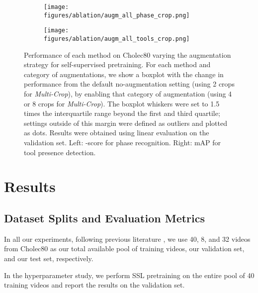\documentclass[times,twocolumn,final]{elsarticle}
\begin{document}
\begin{figure*}[ht]
  \centering
  \begin{subfigure}
    \centering
    \texttt{[image: figures/ablation/augm\_all\_phase\_crop.png]}
  \end{subfigure}
  \begin{subfigure}
    \centering
    \texttt{[image: figures/ablation/augm\_all\_tools\_crop.png]} 
  \end{subfigure}
  \caption{Performance of each method on Cholec80 varying the augmentation strategy for self-supervised pretraining. For each method and category of augmentations, we show a boxplot with the change in performance from the default no-augmentation setting (using 2 crops for \textit{Multi-Crop}), by enabling that category of augmentation (using 4 or 8 crops for \textit{Multi-Crop}). The boxplot whiskers were set to 1.5 times the interquartile range beyond the first and third quartile; settings outside of this margin were defined as outliers and plotted as dots. Results were obtained using linear evaluation on the validation set. Left: -score for phase recognition. Right: mAP for tool presence detection.}
  \label{fig:abl_augm}
\end{figure*}

\section{Results}
\subsection{Dataset Splits and Evaluation Metrics}
\label{sec:metrics_and_splits}
In all our experiments, following previous literature \citep{Czempiel2020TeCNOSP, svrcnet, twinanda2016endonet, opera}, we use 40, 8, and 32 videos from Cholec80 as our total available pool of training videos, our validation set, and our test set, respectively.

In the hyperparameter study, we perform SSL pretraining on the entire pool of 40 training videos and report the results on the validation set.
\end{document}
